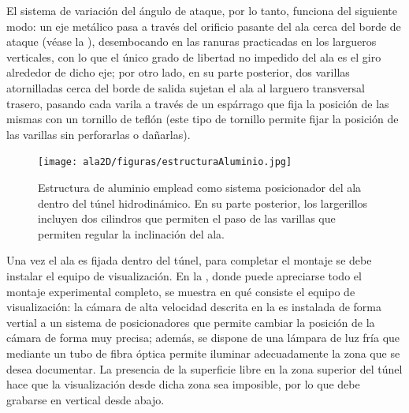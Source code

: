 El sistema de variación del ángulo de ataque, por lo tanto, funciona del siguiente modo: un eje metálico  pasa a través del orificio pasante del ala cerca del borde de ataque (véase la ), desembocando en las ranuras practicadas en los largueros verticales, con lo que el único grado de libertad no impedido del ala es el giro alrededor de dicho eje; por otro lado, en su parte posterior, dos varillas atornilladas cerca del borde de salida sujetan el ala al larguero transversal trasero, pasando cada varila a través de un espárrago que fija la posición de las mismas con un tornillo de teflón (este tipo de tornillo permite fijar la posición de las varillas sin perforarlas o dañarlas). 


\begin{figure}
\centering
\texttt{[image: ala2D/figuras/estructuraAluminio.jpg]}
\caption{Estructura de aluminio emplead como sistema posicionador del ala dentro del túnel hidrodinámico. En su parte posterior, los largerillos incluyen dos cilindros que permiten el paso de las varillas que permiten regular la inclinación del ala.}
\end{figure}


Una vez el ala es fijada dentro del túnel, para completar el montaje se debe instalar el equipo de visualización. En la , donde puede apreciarse todo el montaje experimental completo, se muestra en qué consiste el equipo de visualización: la cámara de alta velocidad descrita en la  es instalada de forma vertial a un sistema de posicionadores que permite cambiar la posición de la cámara de forma muy precisa; además, se dispone de una lámpara de luz fría que mediante un tubo de fibra óptica permite iluminar adecuadamente la zona que se desea documentar. La presencia de la superficie libre en la zona superior del túnel hace que la visualización desde dicha zona sea imposible, por lo que debe grabarse en vertical desde abajo. 


